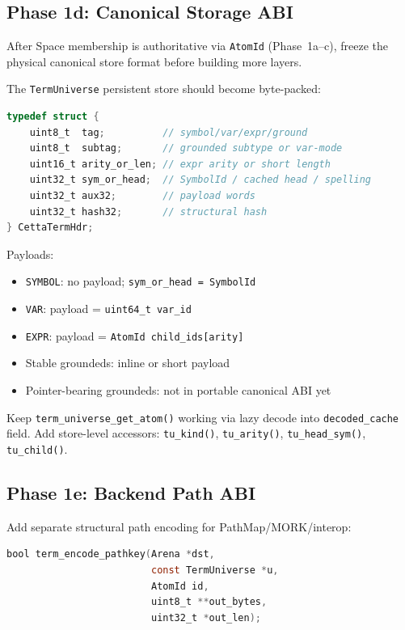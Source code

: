 \documentclass[11pt]{article}
\newcommand{\code}[1]{\texttt{#1}}
\newcommand{\PathMap}{\textup{PathMap}}
\newcommand{\MORK}{\textup{MORK}}
\begin{document}
\subsection{Phase 1d: Canonical Storage ABI}

After Space membership is authoritative via \code{AtomId} (Phase~1a--c), freeze the
physical canonical store format before building more layers.

The \code{TermUniverse} persistent store should become byte-packed:

\begin{lstlisting}[language=C]
typedef struct {
    uint8_t  tag;          // symbol/var/expr/ground
    uint8_t  subtag;       // grounded subtype or var-mode
    uint16_t arity_or_len; // expr arity or short length
    uint32_t sym_or_head;  // SymbolId / cached head / spelling
    uint32_t aux32;        // payload words
    uint32_t hash32;       // structural hash
} CettaTermHdr;
\end{lstlisting}

Payloads:
\begin{itemize}
\item \code{SYMBOL}: no payload; \code{sym\_or\_head = SymbolId}
\item \code{VAR}: payload = \code{uint64\_t var\_id}
\item \code{EXPR}: payload = \code{AtomId child\_ids[arity]}
\item Stable groundeds: inline or short payload
\item Pointer-bearing groundeds: not in portable canonical ABI yet
\end{itemize}

Keep \code{term\_universe\_get\_atom()} working via lazy decode into
\code{decoded\_cache} field.  Add store-level accessors:
\code{tu\_kind()}, \code{tu\_arity()}, \code{tu\_head\_sym()}, \code{tu\_child()}.

\subsection{Phase 1e: Backend Path ABI}

Add separate structural path encoding for \PathMap{}/\MORK{}/interop:

\begin{lstlisting}[language=C]
bool term_encode_pathkey(Arena *dst,
                         const TermUniverse *u,
                         AtomId id,
                         uint8_t **out_bytes,
                         uint32_t *out_len);
\end{lstlisting}
\end{document}
